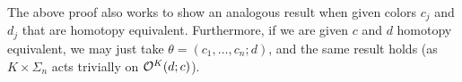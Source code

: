 \documentclass[psamsfonts,oneside,10pt,letterpaper
,draft
]{amsart}%
\renewcommand{\C}{\ensuremath{\mathfrak{C}}}
\renewcommand{\1}{\ensuremath{\mathbb{id}}}
\begin{document}
\begin{remark}
      \label{CAV_4.14_REM}
      The above proof also works to show an analogous result when given colors $c_j$ and $d_j$ that are homotopy equivalent.
      Furthermore, if we are given $c$ and $d$ homotopy equivalent, we may just take $\theta = (c_1,\dots, c_n;d)$,
      and the same result holds (as $K\times\Sigma_n$ acts trivially on $\mathcal{O}^K(d;c)$).
\end{remark}




\end{document}
